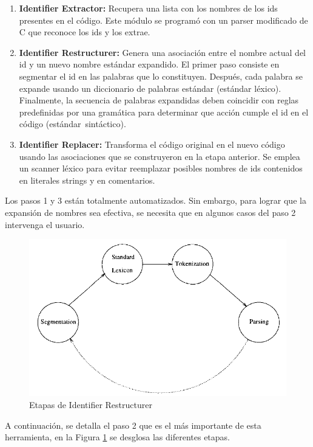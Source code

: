 \begin{enumerate}
\itemsep0em%
\item \textbf{Identifier Extractor:} Recupera una lista con los nombres de los ids presentes en el código. Este módulo se programó con un parser modificado de C que reconoce los ids y los extrae.
\item \textbf{Identifier Restructurer:} Genera una asociación entre el nombre actual del id y un nuevo nombre estándar expandido. El primer paso consiste en segmentar el id en las palabras que lo constituyen. Después, cada palabra se expande usando un diccionario de palabras estándar (estándar léxico). Finalmente, la secuencia de palabras expandidas deben coincidir con reglas predefinidas por una gramática para determinar que acción cumple el id en el código \mbox{(estándar sintáctico).}
\item \textbf{Identifier Replacer:} Transforma el código original en el nuevo código usando las asociaciones que se construyeron en la etapa anterior. Se emplea un scanner léxico para evitar reemplazar posibles nombres de ids contenidos en literales strings y en comentarios.
\end{enumerate}

Los pasos 1 y 3 están totalmente automatizados. Sin embargo, para lograr que la expansión de nombres sea efectiva, se necesita que en algunos casos del paso 2 intervenga el usuario.

\begin{figure}[h] %
\centering
\includegraphics[scale= 0.60]{./cap3/ire_2.png}
\caption{Etapas de Identifier Restructurer}
\label{ire2}
\end{figure}

A continuación, se detalla el paso 2 que es el más importante de esta herramienta, en la Figura \ref{ire2} se desglosa las diferentes etapas.

